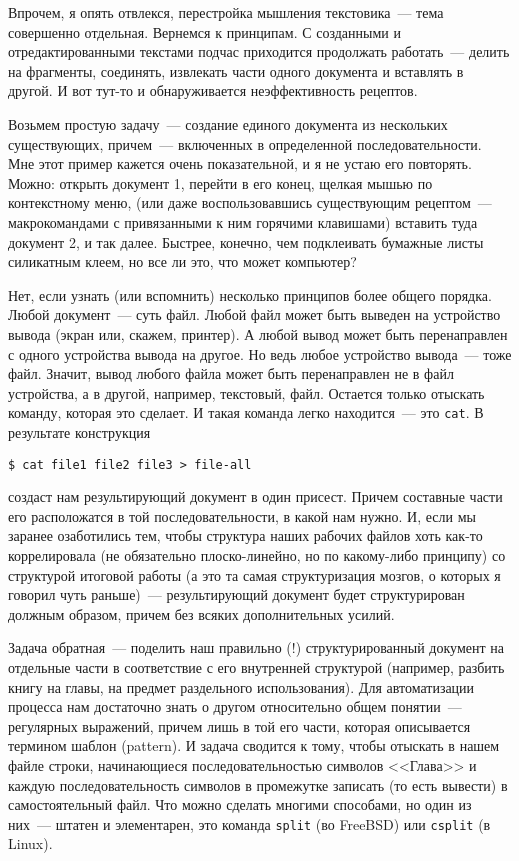 Впрочем, я опять отвлекся, перестройка мышления текстовика~--- тема совершенно отдельная. Вернемся к принципам. С созданными и отредактированными текстами подчас приходится продолжать работать~--- делить на фрагменты, соединять, извлекать части одного документа и вставлять в другой. И вот тут-то и обнаруживается неэффективность рецептов.

Возьмем простую задачу~--- создание единого документа из нескольких существующих, причем~--- включенных в определенной последовательности. Мне этот пример кажется очень показательной, и я не устаю его повторять. Можно: открыть документ 1, перейти в его конец, щелкая мышью по контекстному меню, (или даже воспользовавшись существующим рецептом~--- макрокомандами с привязанными к ним горячими клавишами) вставить туда документ 2, и так далее. Быстрее, конечно, чем подклеивать бумажные листы силикатным клеем, но все ли это, что может компьютер?

Нет, если узнать (или вспомнить) несколько принципов более общего порядка. Любой документ~--- суть файл. Любой файл может быть выведен на устройство вывода (экран или, скажем, принтер). А любой вывод может быть перенаправлен с одного устройства вывода на другое. Но ведь любое устройство вывода~--- тоже файл. Значит, вывод любого файла может быть перенаправлен не в файл устройства, а в другой, например, текстовый, файл. Остается только отыскать команду, которая это сделает. И такая команда легко находится~--- это 
\texttt{cat}. В результате конструкция

\medskip\texttt{\$ cat file1 file2 file3 > file-all}\medskip

создаст нам результирующий документ в один присест. Причем составные части его расположатся в той последовательности, в какой нам нужно. И, если мы заранее озаботились тем, чтобы структура наших рабочих файлов хоть как-то коррелировала (не обязательно плоско-линейно, но по какому-либо принципу) со структурой итоговой работы (а это та самая структуризация мозгов, о которых я говорил чуть раньше)~--- результирующий документ будет структурирован должным образом, причем без всяких дополнительных усилий.

Задача обратная~--- поделить наш правильно (!) структурированный документ на отдельные части в соответствие с его внутренней структурой (например, разбить книгу на главы, на предмет раздельного использования). Для автоматизации процесса нам достаточно знать о другом относительно общем понятии~--- регулярных выражений, причем лишь в той его части, которая описывается термином шаблон (pattern). И задача сводится к тому, чтобы отыскать в нашем файле строки, начинающиеся последовательностью символов <<Глава>> и каждую последовательность символов в промежутке записать (то есть вывести) в самостоятельный файл. Что можно сделать многими способами, но один из них~--- штатен и элементарен, это команда \texttt{split} (во FreeBSD) или \texttt{csplit} (в Linux).

